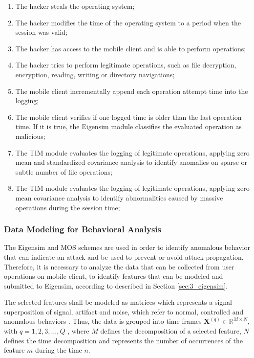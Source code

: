\begin{enumerate}[label=(\alph*)]
	\item The hacker steals the operating system;
	\item The hacker modifies the time of the operating system to a period when the session was valid;
	\item The hacker has access to the mobile client and is able to perform operations;
	\item The hacker tries to perform legitimate operations, such as file decryption, encryption, reading, writing or directory navigations;
	\item The mobile client incrementally append each operation attempt time into the logging;
	\item The mobile client verifies if one logged time is older than the last operation time. If it is true, the Eigensim module classifies the evaluated operation as malicious;
	\item The TIM module evaluates the logging of legitimate operations, applying zero mean and standardized covariance analysis to identify anomalies on sparse or subtle number of file operations;
	\item The TIM module evaluates the logging of legitimate operations, applying zero mean covariance analysis to identify abnormalities caused by massive operations during the session time;
\end{enumerate}

\subsubsection{Data Modeling for Behavioral Analysis }
\label{sec:3_data}

The Eigensim and MOS schemes are used in order to identify anomalous behavior that can indicate an attack and be used to prevent or avoid attack propagation. Therefore, it is necessary to analyze the data that can be collected from user operations on mobile client, to identify features that can be modeled and submitted to Eigensim, according to described in Section \ref{sec:3_eigensim}.

The selected features shall be modeled as matrices which represents a signal superposition of signal, artifact and noise, which refer to normal, controlled and anomalous behaviors \cite{tenorio2013greatest,vieira2017model}. Thus, the data is grouped into time frames $\pmb{X}^{(q)} \in \mathbb{R}^{M\times{N}}$, with $q = 1, 2, 3, \ldots, Q$ , where $M$ defines the decomposition of a selected feature, $N$ defines the time decomposition and represents the number of occurrences of the feature $m$ during the time $n$.

